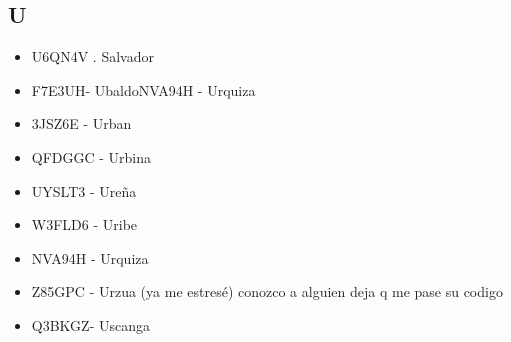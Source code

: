 \subsection*{U}
\begin{itemize}[leftmargin=*,nosep]
\item U6QN4V . Salvador
\item F7E3UH- UbaldoNVA94H   -  Urquiza
\item 3JSZ6E - Urban
\item QFDGGC - Urbina
\item UYSLT3 - Ureña
\item W3FLD6  -  Uribe
\item NVA94H - Urquiza
\item Z85GPC  -  Urzua (ya me estresé) conozco a alguien deja q me pase su codigo
\item Q3BKGZ- Uscanga
\end{itemize}


